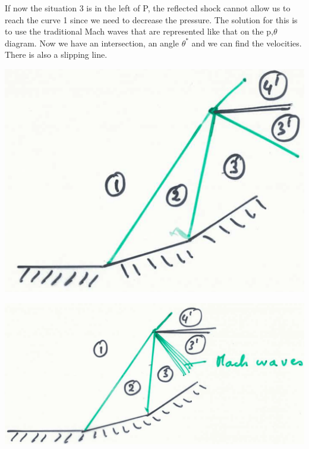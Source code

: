 If now the situation 3 is in the left of P, the reflected shock cannot allow us to reach the curve 1 since we need to decrease the pressure. The solution for this is to use the traditional Mach waves that are represented like that on the p,$\theta$ diagram. Now we have an intersection, an angle $\theta ^*$ and we can find the velocities. There is also a slipping line. 

\begin{center}
\begin{minipage}{0.33\textwidth}
\includegraphics[scale=0.1]{ch9/22}
\end{minipage}
\begin{minipage}{0.4\textwidth}
\includegraphics[scale=0.1]{ch9/23}
\end{minipage}
\end{center}

\begin{center}
\end{center}